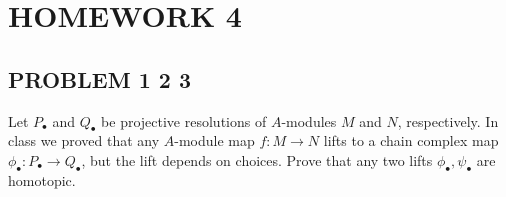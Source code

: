 \chapter{HOMEWORK 4}

\section{PROBLEM 1 2 3}

\begin{problem}[problem 1]
	\label{problem1}
	Let $P_\bullet$ and $Q_\bullet$ be projective  resolutions of $A$-modules $M$ and $N$, respectively. In class we proved that any $A$-module map $f: M \to N$ lifts to a chain complex map $\phi_\bullet: P_\bullet \to Q_\bullet$, but the lift depends on choices. Prove that any two lifts $\phi_\bullet, \psi_\bullet$ are homotopic.
\end{problem}

